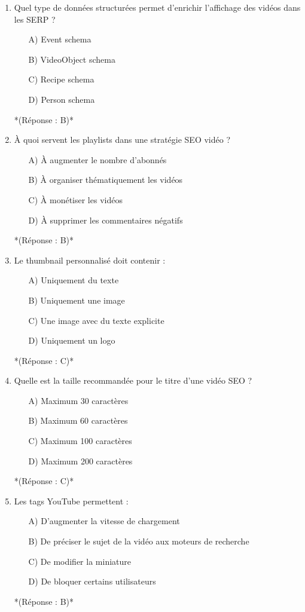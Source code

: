 \documentclass[12pt,a4paper,twoside]{report}
\begin{document}
\begin{enumerate}
    \item Quel type de données structurées permet d'enrichir l'affichage des vidéos dans les SERP ?
    \begin{itemize}
        \item[A)] Event schema
        \item[B)] VideoObject schema
        \item[C)] Recipe schema
        \item[D)] Person schema
    \end{itemize}
    *(Réponse : B)*

    \item À quoi servent les playlists dans une stratégie SEO vidéo ?
    \begin{itemize}
        \item[A)] À augmenter le nombre d'abonnés
        \item[B)] À organiser thématiquement les vidéos
        \item[C)] À monétiser les vidéos
        \item[D)] À supprimer les commentaires négatifs
    \end{itemize}
    *(Réponse : B)*

    \item Le thumbnail personnalisé doit contenir :
    \begin{itemize}
        \item[A)] Uniquement du texte
        \item[B)] Uniquement une image
        \item[C)] Une image avec du texte explicite
        \item[D)] Uniquement un logo
    \end{itemize}
    *(Réponse : C)*

    \item Quelle est la taille recommandée pour le titre d'une vidéo SEO ?
    \begin{itemize}
        \item[A)] Maximum 30 caractères
        \item[B)] Maximum 60 caractères
        \item[C)] Maximum 100 caractères
        \item[D)] Maximum 200 caractères
    \end{itemize}
    *(Réponse : C)*

    \item Les tags YouTube permettent :
    \begin{itemize}
        \item[A)] D'augmenter la vitesse de chargement
        \item[B)] De préciser le sujet de la vidéo aux moteurs de recherche
        \item[C)] De modifier la miniature
        \item[D)] De bloquer certains utilisateurs
    \end{itemize}
    *(Réponse : B)*


\end{enumerate}
\end{document}
